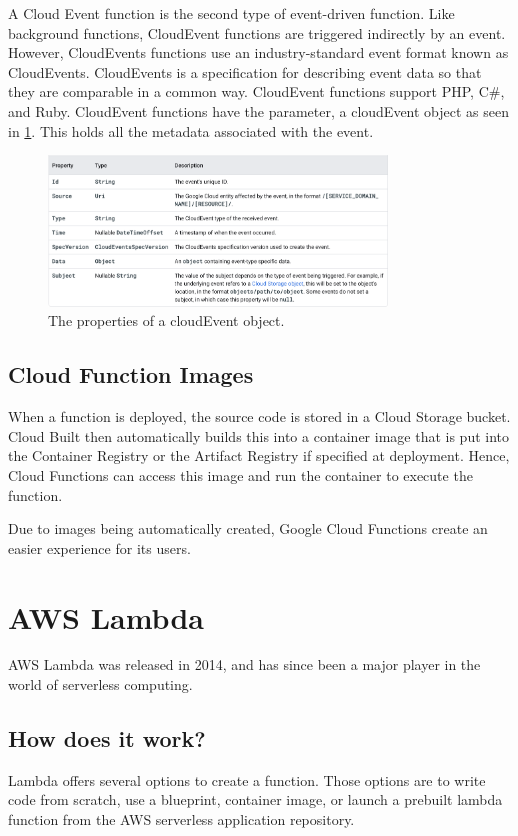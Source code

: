 \documentclass[10pt, conference]{IEEEtran}
\begin{document}
A Cloud Event function is the second type of event-driven function. Like background functions, CloudEvent functions are triggered indirectly by an event. However, CloudEvents functions use an industry-standard event format known as CloudEvents. CloudEvents is a specification for describing event data so that they are comparable in a common way. CloudEvent functions support PHP, C\#, and Ruby. CloudEvent functions have the parameter, a cloudEvent object as seen in \ref{fig:param2}. This holds all the metadata associated with the event.

\begin{figure}[htbp]
\centerline{\includegraphics[width=9cm]{cloudEvent.PNG}}
\caption{The properties of a cloudEvent object.}
\label{fig:param2}
\end{figure}

\subsection{Cloud Function Images }

When a function is deployed, the source code is stored in a Cloud Storage bucket. Cloud Built then automatically builds this into a container image that is put into the Container Registry or the Artifact Registry if specified at deployment. Hence, Cloud Functions can access this image and run the container to execute the function. 

Due to images being automatically created, Google Cloud Functions create an easier experience for its users. 

\section{ AWS Lambda}
AWS Lambda was released in 2014, and has since been a major player in the world of serverless computing. 
\subsection{How does it work?}

Lambda offers several options to create a function. Those options are to write code from scratch, use a blueprint, container image, or launch a prebuilt lambda function from the AWS serverless application repository.
\end{document}
